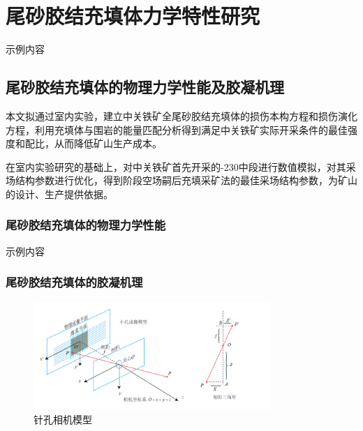 \chapter{尾砂胶结充填体力学特性研究}
示例内容

\section{尾砂胶结充填体的物理力学性能及胶凝机理}
本文拟通过室内实验，建立中关铁矿全尾砂胶结充填体的损伤本构方程和损伤演化方程，利用充填体与围岩的能量匹配分析得到满足中关铁矿实际开采条件的最佳强度和配比，从而降低矿山生产成本。

在室内实验研究的基础上，对中关铁矿首先开采的-230中段进行数值模拟，对其采场结构参数进行优化，得到阶段空场嗣后充填采矿法的最佳采场结构参数，为矿山的设计、生产提供依据。


\subsection{尾砂胶结充填体的物理力学性能}
示例内容

\subsection{尾砂胶结充填体的胶凝机理}
	\begin{figure}[!htbp]
	\centering
	\includegraphics[width=0.80\textwidth]{myfigures/slam-01.png} %
	\caption{针孔相机模型} %
	\label{slam-01} %
\end{figure}
